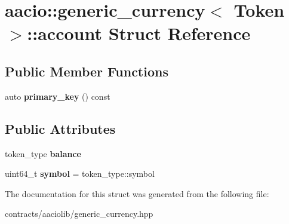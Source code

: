 \hypertarget{structaacio_1_1generic__currency_1_1account}{}\section{aacio\+:\+:generic\+\_\+currency$<$ Token $>$\+:\+:account Struct Reference}
\label{structaacio_1_1generic__currency_1_1account}
\subsection*{Public Member Functions}
\begin{DoxyCompactItemize}
\item 
\mbox{\label{structaacio_1_1generic__currency_1_1account_a31efdaa1a59584bf42ba8e08179d626b}} 
auto {\bfseries primary\+\_\+key} () const
\end{DoxyCompactItemize}
\subsection*{Public Attributes}
\begin{DoxyCompactItemize}
\item 
\mbox{\label{structaacio_1_1generic__currency_1_1account_ae18b9f726f73d76bedba5c4538c2bae0}} 
token\+\_\+type {\bfseries balance}
\item 
\mbox{\label{structaacio_1_1generic__currency_1_1account_a7b2d457934ef6db17241f58f2e23d520}} 
uint64\+\_\+t {\bfseries symbol} = token\+\_\+type\+::symbol
\end{DoxyCompactItemize}


The documentation for this struct was generated from the following file\+:\begin{DoxyCompactItemize}
\item 
contracts/aaciolib/generic\+\_\+currency.\+hpp\end{DoxyCompactItemize}
